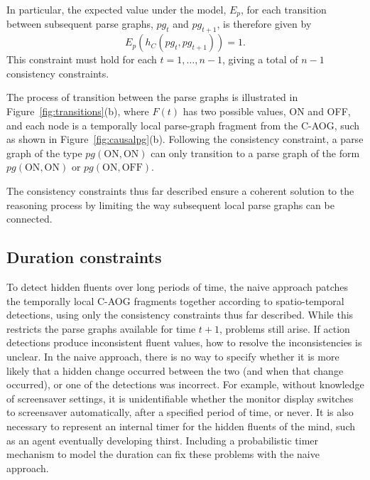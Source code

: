 \documentclass[10pt,journal,letterpaper,compsoc]{IEEEtran}
\begin{document}
In particular, the expected value under the model, $E_{p}$, for each transition between subsequent parse graphs, $pg_{t}$ and $pg_{t+1}$, is therefore given by
\begin{equation} E_{p} \left( h_C (pg_{t}, pg_{t+1}) \right) = 1. \end{equation}
This constraint must hold for each $t = 1, \ldots, n-1$, giving a total of $n-1$ consistency constraints.


The process of transition between the parse graphs is illustrated in Figure~\ref{fig:transitions}(b), where $F(t)$ has two possible values, ON and OFF, and each node is a temporally local parse-graph fragment from the C-AOG, such as shown in Figure~\ref{fig:causalpg}(b).  Following the consistency constraint, a parse graph of the type $pg(\textrm{ON}, \textrm{ON})$ can only transition to a parse graph of the form $pg(\textrm{ON}, \textrm{ON})$ or $pg(\textrm{ON}, \textrm{OFF})$.  

The consistency constraints thus far described ensure a coherent solution to the reasoning process by limiting the way subsequent local parse graphs can be connected. 



\subsection{Duration constraints}

To detect hidden fluents over long periods of time, the naive approach patches the temporally local C-AOG fragments together according to spatio-temporal detections, using only the consistency constraints thus far described.  While this restricts the parse graphs available for time $t+1$, problems still arise.  If action detections produce inconsistent fluent values, how to resolve the inconsistencies is unclear.  In the naive approach, there is no way to specify whether it is more likely that a hidden change occurred between the two (and when that change occurred), or one of the detections was incorrect.  For example, without knowledge of screensaver settings, it is unidentifiable whether the monitor display switches to screensaver automatically, after a specified period of time, or never.  It is also necessary to represent an internal timer for the hidden fluents of the mind, such as an agent eventually developing thirst.  Including a probabilistic timer mechanism to model the duration can fix these problems with the naive approach.
\end{document}
